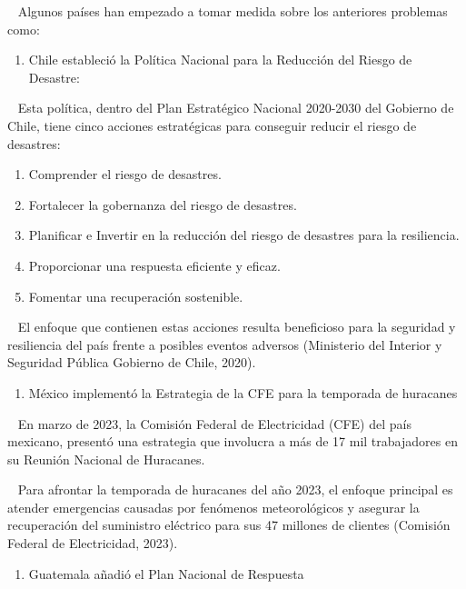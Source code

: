 \documentclass{article}
\providecommand{\tightlist}{%
  \setlength{\itemsep}{0pt}\setlength{\parskip}{0pt}}
\begin{document}
~ Algunos países han empezado a tomar medida sobre los anteriores
problemas como:

\begin{enumerate}
\def\labelenumi{\arabic{enumi}.}
\tightlist
\item
  Chile estableció la Política Nacional para la Reducción del Riesgo de
  Desastre:
\end{enumerate}

~ Esta política, dentro del Plan Estratégico Nacional 2020-2030 del
Gobierno de Chile, tiene cinco acciones estratégicas para conseguir
reducir el riesgo de desastres:

\begin{enumerate}
\def\labelenumi{\arabic{enumi}.}
\tightlist
\item
  Comprender el riesgo de desastres.
\item
  Fortalecer la gobernanza del riesgo de desastres.
\item
  Planificar e Invertir en la reducción del riesgo de desastres para la
  resiliencia.
\item
  Proporcionar una respuesta eficiente y eficaz.
\item
  Fomentar una recuperación sostenible.
\end{enumerate}

~ El enfoque que contienen estas acciones resulta beneficioso para la
seguridad y resiliencia del país frente a posibles eventos adversos
(Ministerio del Interior y Seguridad Pública Gobierno de Chile, 2020).

\begin{enumerate}
\def\labelenumi{\arabic{enumi}.}
\setcounter{enumi}{1}
\tightlist
\item
  México implementó la Estrategia de la CFE para la temporada de
  huracanes
\end{enumerate}

~ En marzo de 2023, la Comisión Federal de Electricidad (CFE) del país
mexicano, presentó una estrategia que involucra a más de 17 mil
trabajadores en su Reunión Nacional de Huracanes.

~ Para afrontar la temporada de huracanes del año 2023, el enfoque
principal es atender emergencias causadas por fenómenos meteorológicos y
asegurar la recuperación del suministro eléctrico para sus 47 millones
de clientes (Comisión Federal de Electricidad, 2023).

\begin{enumerate}
\def\labelenumi{\arabic{enumi}.}
\setcounter{enumi}{2}
\tightlist
\item
  Guatemala añadió el Plan Nacional de Respuesta
\end{enumerate}
\end{document}
